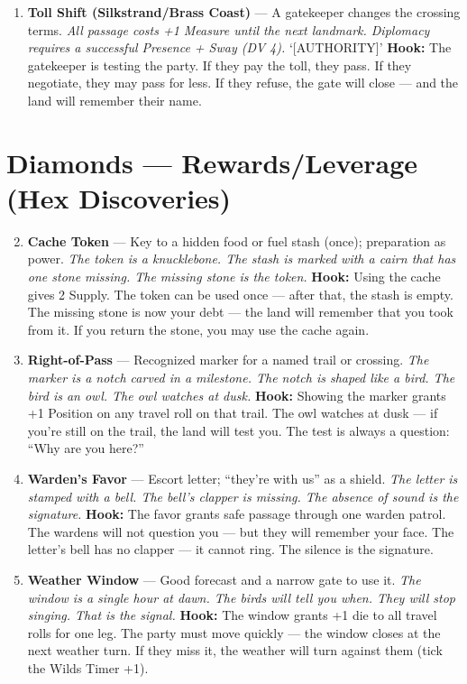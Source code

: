 \begin{enumerate}
\item \textbf{Toll Shift (Silkstrand/Brass Coast)} --- A gatekeeper changes the crossing terms.
  \hfill \textit{All passage costs +1 Measure until the next landmark. Diplomacy requires a successful Presence + Sway (DV 4).} `[AUTHORITY]'
  \textbf{Hook:} The gatekeeper is testing the party. If they pay the toll, they pass. If they negotiate, they may pass for less. If they refuse, the gate will close --- and the land will remember their name.
\end{enumerate}

\section*{Diamonds --- Rewards/Leverage (Hex Discoveries)}
\label{sec:wilderness-rewards}
\begin{enumerate}
\setcounter{enumi}{1}
\item \textbf{Cache Token} --- Key to a hidden food or fuel stash (once); preparation as power.
  \hfill \textit{The token is a knucklebone. The stash is marked with a cairn that has one stone missing. The missing stone is the token.}
  \textbf{Hook:} Using the cache gives 2 Supply. The token can be used once --- after that, the stash is empty. The missing stone is now your debt --- the land will remember that you took from it. If you return the stone, you may use the cache again.
  
\item \textbf{Right-of-Pass} --- Recognized marker for a named trail or crossing.
  \hfill \textit{The marker is a notch carved in a milestone. The notch is shaped like a bird. The bird is an owl. The owl watches at dusk.}
  \textbf{Hook:} Showing the marker grants +1 Position on any travel roll on that trail. The owl watches at dusk --- if you're still on the trail, the land will test you. The test is always a question: ``Why are you here?''
  
\item \textbf{Warden's Favor} --- Escort letter; ``they're with us'' as a shield.
  \hfill \textit{The letter is stamped with a bell. The bell's clapper is missing. The absence of sound is the signature.}
  \textbf{Hook:} The favor grants safe passage through one warden patrol. The wardens will not question you --- but they will remember your face. The letter's bell has no clapper --- it cannot ring. The silence is the signature.
  
\item \textbf{Weather Window} --- Good forecast and a narrow gate to use it.
  \hfill \textit{The window is a single hour at dawn. The birds will tell you when. They will stop singing. That is the signal.}
  \textbf{Hook:} The window grants +1 die to all travel rolls for one leg. The party must move quickly --- the window closes at the next weather turn. If they miss it, the weather will turn against them (tick the Wilds Timer +1).
  

\end{enumerate}
